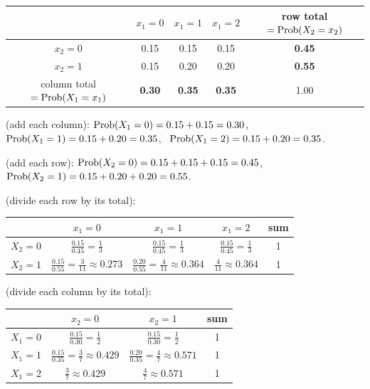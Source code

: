 \documentclass[11pt]{article}
\begin{document}
\solution
{}
\begin{center}
\begin{tabular}{c|ccc|c}\toprule
 & $x_1=0$ & $x_1=1$ & $x_1=2$ & row total $=\mathrm{Prob}(X_2=x_2)$\\\midrule
$x_2=0$ & 0.15 & 0.15 & 0.15 & \textbf{0.45}\\
$x_2=1$ & 0.15 & 0.20 & 0.20 & \textbf{0.55}\\\midrule
column total $=\mathrm{Prob}(X_1=x_1)$ & \textbf{0.30} & \textbf{0.35} & \textbf{0.35} & 1.00\\\bottomrule
\end{tabular}
\end{center}

 (add each column):
$\mathrm{Prob}(X_1=0)=0.15+0.15=0.30$, \ $\mathrm{Prob}(X_1=1)=0.15+0.20=0.35$, \ $\mathrm{Prob}(X_1=2)=0.15+0.20=0.35$.

 (add each row):
$\mathrm{Prob}(X_2=0)=0.15+0.15+0.15=0.45$, \ $\mathrm{Prob}(X_2=1)=0.15+0.20+0.20=0.55$.

 (divide each row by its total):
\begin{center}
\begin{tabular}{c|ccc|c}\toprule
 & $x_1=0$ & $x_1=1$ & $x_1=2$ & sum\\\midrule
$X_2=0$ & $\frac{0.15}{0.45}=\frac13$ & $\frac{0.15}{0.45}=\frac13$ & $\frac{0.15}{0.45}=\frac13$ & 1\\[3pt]
$X_2=1$ & $\frac{0.15}{0.55}=\frac{3}{11}\approx0.273$ & $\frac{0.20}{0.55}=\frac{4}{11}\approx0.364$ & $\frac4{11}\approx0.364$ & 1\\\bottomrule
\end{tabular}
\end{center}

 (divide each column by its total):
\begin{center}
\begin{tabular}{c|cc|c}\toprule
 & $x_2=0$ & $x_2=1$ & sum\\\midrule
$X_1=0$ & $\frac{0.15}{0.30}=\frac12$ & $\frac{0.15}{0.30}=\frac12$ & 1\\[3pt]
$X_1=1$ & $\frac{0.15}{0.35}=\frac37\approx0.429$ & $\frac{0.20}{0.35}=\frac47\approx0.571$ & 1\\[3pt]
$X_1=2$ & $\frac37\approx0.429$ & $\frac47\approx0.571$ & 1\\\bottomrule
\end{tabular}
\end{center}
\end{document}
